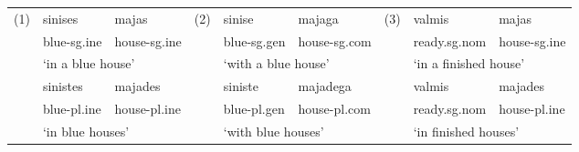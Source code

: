 \begin{table}[h]
\small
\begin{tabular}{cllcllcll}
(1) & sinises & majas & (2) & sinise & majaga & (3) & valmis & majas \\
& blue-{\sc sg.ine} & house-{\sc sg.ine} &  & blue-{\sc sg.gen} & house-{\sc sg.com} &  & ready.{\sc sg.nom} & house-{\sc sg.ine} \\
& \multicolumn{2}{l}{`in a blue house'} &  & \multicolumn{2}{l}{`with a blue house'} &  & \multicolumn{2}{l}{`in a finished house'} \\
& sinistes & majades &  & siniste & majadega &  & valmis & majades \\
& blue-{\sc pl.ine} & house-{\sc pl.ine} &  & blue-{\sc pl.gen} & house-{\sc pl.com} &  & ready.{\sc sg.nom} & house-{\sc pl.ine} \\
& \multicolumn{2}{l}{`in blue houses'} &  & \multicolumn{2}{l}{`with blue
                                         houses'} &  &
                                                     \multicolumn{2}{l}{`in finished houses'}

\end{tabular}
\end{table}



